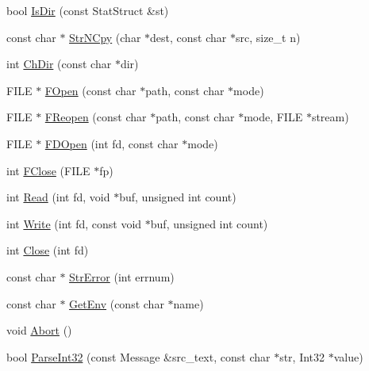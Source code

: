 \begin{DoxyCompactItemize}
bool \hyperlink{namespacetesting_1_1internal_1_1posix_abee7434e7bcb311fff367f690e97cfcd}{\-Is\-Dir} (const \-Stat\-Struct \&st)
\item 
const char $\ast$ \hyperlink{namespacetesting_1_1internal_1_1posix_a261b7136efb272312daa5c1f82e88c79}{\-Str\-N\-Cpy} (char $\ast$dest, const char $\ast$src, size\-\_\-t n)
\item 
int \hyperlink{namespacetesting_1_1internal_1_1posix_a99a868de1d5ace7a494124cabfe5f119}{\-Ch\-Dir} (const char $\ast$dir)
\item 
\-F\-I\-L\-E $\ast$ \hyperlink{namespacetesting_1_1internal_1_1posix_a71d8d763c7a5feba8bbb9a65fdc4cc87}{\-F\-Open} (const char $\ast$path, const char $\ast$mode)
\item 
\-F\-I\-L\-E $\ast$ \hyperlink{namespacetesting_1_1internal_1_1posix_a97431e0bfd874f9d198aff7807139e36}{\-F\-Reopen} (const char $\ast$path, const char $\ast$mode, \-F\-I\-L\-E $\ast$stream)
\item 
\-F\-I\-L\-E $\ast$ \hyperlink{namespacetesting_1_1internal_1_1posix_a91847cc22a69779893a4eda11daeabdc}{\-F\-D\-Open} (int fd, const char $\ast$mode)
\item 
int \hyperlink{namespacetesting_1_1internal_1_1posix_a69185e213a0e903723d28fe4db39e5ae}{\-F\-Close} (\-F\-I\-L\-E $\ast$fp)
\item 
int \hyperlink{namespacetesting_1_1internal_1_1posix_a6c02983bd73d8083cd46e47b7cd114f1}{\-Read} (int fd, void $\ast$buf, unsigned int count)
\item 
int \hyperlink{namespacetesting_1_1internal_1_1posix_a9bb8588c4b70daa75e2507d8c845e224}{\-Write} (int fd, const void $\ast$buf, unsigned int count)
\item 
int \hyperlink{namespacetesting_1_1internal_1_1posix_a6f8ed9be61fa28cc4bcf197d99d3e898}{\-Close} (int fd)
\item 
const char $\ast$ \hyperlink{namespacetesting_1_1internal_1_1posix_a63c0c6ba1a8123ba43417a7199250f15}{\-Str\-Error} (int errnum)
\item 
const char $\ast$ \hyperlink{namespacetesting_1_1internal_1_1posix_a7ed11bcd211f76641b16e60b5f0594eb}{\-Get\-Env} (const char $\ast$name)
\item 
void \hyperlink{namespacetesting_1_1internal_1_1posix_a12b9283f52eaf7610afe4b04fbca2ff0}{\-Abort} ()
\item 
bool \hyperlink{namespacetesting_1_1internal_a3bd151d0274b216f9c2e6275ccc4a9a3}{\-Parse\-Int32} (const \-Message \&src\-\_\-text, const char $\ast$str, \-Int32 $\ast$value)
\item 

\end{DoxyCompactItemize}
